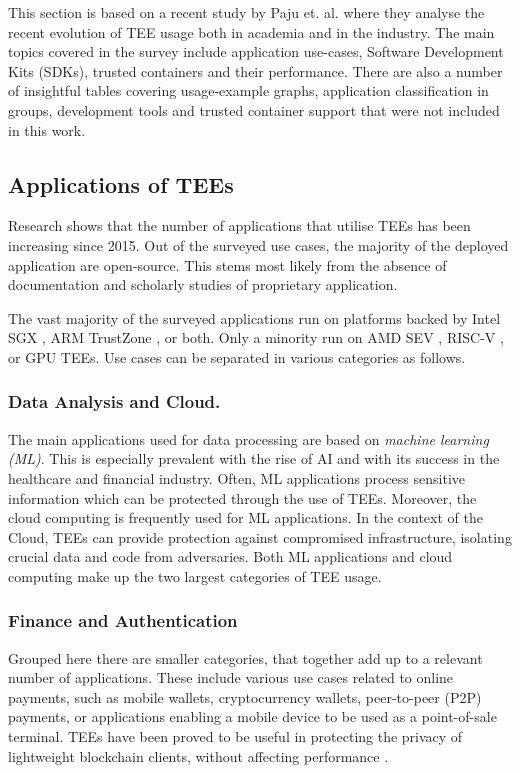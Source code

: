 \documentclass[runningheads,a4paper]{uwsese}
\begin{document}
This section is based on a recent study by Paju et. al. \cite{tee_app_rev}
where they analyse the recent evolution of TEE usage both in academia and in
the industry. The main topics covered in the survey include application
use-cases, Software Development Kits (SDKs), trusted containers and their
performance. There are also a number of insightful tables covering
usage-example graphs, application classification in groups, development tools
and trusted container support that were not included in this work.

\subsection{Applications of TEEs}

Research shows that the number of applications that utilise TEEs has been
increasing since 2015. Out of the surveyed use cases, the majority of the
deployed application are open-source. This stems most likely from the absence
of documentation and scholarly studies of proprietary application.

The vast majority of the surveyed applications run on platforms backed by Intel
SGX \cite{intel_sgx}, ARM TrustZone \cite{arm_tz}, or both. Only a minority run
on AMD SEV \cite{amd_sev}, RISC-V \cite{tee_keystone}, or GPU TEEs. Use cases
can be separated in various categories as follows.

\subsubsection{Data Analysis and Cloud.} 

The main applications used for data processing are based on \emph{machine
learning (ML)}. This is especially prevalent with the rise of AI and with its
success in the healthcare and financial industry. Often, ML applications
process sensitive information which can be protected through the use of TEEs.
Moreover, the cloud computing is frequently used for ML applications. In the
context of the Cloud, TEEs can provide protection against compromised
infrastructure, isolating crucial data and code from adversaries. Both ML
applications and cloud computing make up the two largest categories of TEE
usage.

\subsubsection{Finance and Authentication}

Grouped here there are smaller categories, that together add up to a relevant
number of applications. These include various use cases related to online
payments, such as mobile wallets, cryptocurrency wallets, peer-to-peer (P2P)
payments, or applications enabling a mobile device to be used as a
point-of-sale terminal. TEEs have been proved to be useful in protecting the
privacy of lightweight blockchain clients, without affecting performance
\cite{light_blockchain}.
\end{document}
